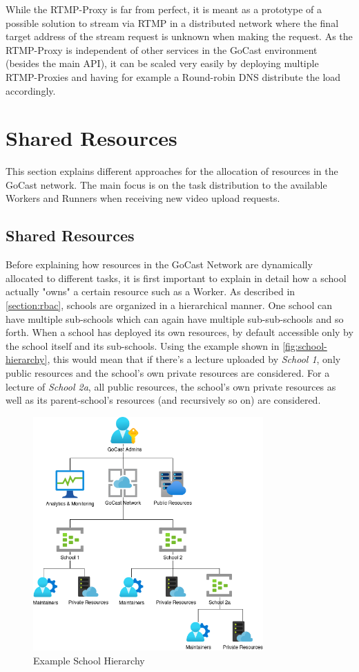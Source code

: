 While the RTMP-Proxy is far from perfect, it is meant as a prototype of a possible solution to stream via \ac{RTMP} in a distributed network where the final target address of the stream request is unknown when making the request. As the RTMP-Proxy is independent of other services in the GoCast environment (besides the main \ac{API}), it can be scaled very easily by deploying multiple RTMP-Proxies and having for example a Round-robin DNS distribute the load accordingly.

\section{Shared Resources}\label{section:shared-resources}

This section explains different approaches for the allocation of resources in the GoCast network. The main focus is on the task distribution to the available Workers and Runners when receiving new video upload requests.

\subsection{Shared Resources}

Before explaining how resources in the GoCast Network are dynamically allocated to different tasks, it is first important to explain in detail how a school actually "owns" a certain resource such as a Worker. As described in \autoref{section:rbac}, schools are organized in a hierarchical manner. One school can have multiple sub-schools which can again have multiple sub-sub-schools and so forth. When a school has deployed its own resources, by default accessible only by the school itself and its sub-schools. Using the example shown in \autoref{fig:school-hierarchy}, this would mean that if there's a lecture uploaded by \textit{School 1}, only public resources and the school's own private resources are considered. For a lecture of \textit{School 2a}, all public resources, the school's own private resources as well as its parent-school's resources (and recursively so on) are considered. 

\begin{figure}[htpb]
    \centering
    \includegraphics[width=250pt]{images/SchoolHierarchy.png}
    \caption[Example School Hierarchy]{Example School Hierarchy}\label{fig:school-hierarchy}
\end{figure}

